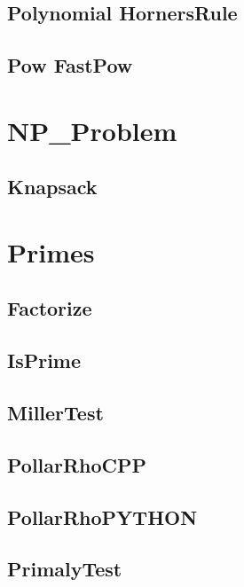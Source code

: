 \subsection{Polynomial HornersRule}
\raggedbottom
\hrulefill
\subsection{Pow FastPow}
\raggedbottom
\hrulefill

\section{NP_Problem}
\subsection{ Knapsack}
\raggedbottom
\hrulefill

\section{Primes}
\subsection{ Factorize}
\raggedbottom
\hrulefill
\subsection{ IsPrime}
\raggedbottom
\hrulefill
\subsection{ MillerTest}
\raggedbottom
\hrulefill
\subsection{ PollarRhoCPP}
\raggedbottom
\hrulefill
\subsection{ PollarRhoPYTHON}
\raggedbottom
\hrulefill
\subsection{ PrimalyTest}
\raggedbottom
\hrulefill
